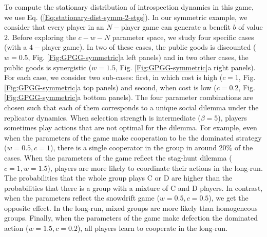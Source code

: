 \documentclass[11pt]{article}
\theoremstyle{plainCl1}
\theoremstyle{plainCl2}
\newcommand{\C}{\mathrm{C}}
\newcommand{\D}{\mathrm{D}}
\begin{document}
\noindent To compute the stationary distribution of introspection dynamics in this game, we use Eq. (\ref{Eq:stationary-dist-symm-2-stgs}). In our symmetric example, we consider that every player in an $N-$player game can generate a benefit $b$ of value $2$. Before exploring the $c-w-N$ parameter space, we study four specific cases (with a $4-$player game).  In two of these cases, the public goods is discounted ($w = 0.5$, Fig. \ref{Fig:GPGG-symmetric}a left panels) and in two other cases, the public goods is synergistic ($w = 1.5$, Fig. \ref{Fig:GPGG-symmetric}a right panels). For each case, we consider two sub-cases: first, in which cost is high ($c = 1$,  Fig. \ref{Fig:GPGG-symmetric}a top panels) and second, when cost is low ($c = 0.2$, Fig. \ref{Fig:GPGG-symmetric}a bottom panels). The four parameter combinations are chosen such that each of them corresponds to a unique social dilemma under the replicator dynamics.  
When selection strength is intermediate ($\beta = 5$), players sometimes play actions that are not optimal for the dilemma. For example, even when the parameters of the game make cooperation to be the dominated strategy ($w = 0.5, c = 1$), there is a single cooperator in the group in around 20$\%$ of the cases. When the parameters of the game reflect the stag-hunt dilemma ($c = 1, w = 1.5$), players are more likely to coordinate their actions in the long-run. The probabilities that the whole group plays $\C$ or $\D$ are higher than the probabilities that there is a group with a mixture of $\C$ and $\D$ players. In contrast, when the parameters reflect the snowdrift game ($w = 0.5, c = 0.5$), we get the opposite effect. In the long-run, mixed groups are more likely than homogeneous groups. Finally, when the parameters of the game make defection the dominated action ($w = 1.5, c = 0.2$), all players learn to cooperate in the long-run. \\ \\ 
\end{document}
